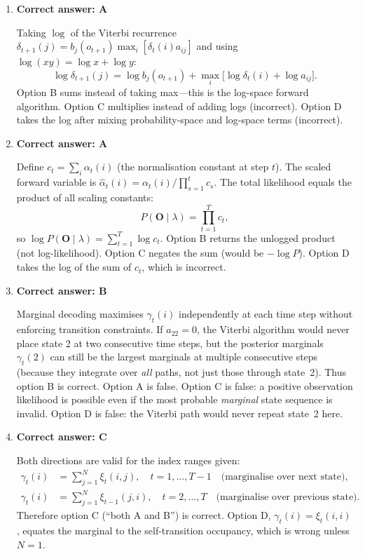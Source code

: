 \documentclass[12pt]{article}
\begin{document}
\begin{enumerate}[label=\textbf{Q\arabic*.}, leftmargin=*, itemsep=1.5em]
\item \textbf{Correct answer: A}

Taking $\log$ of the Viterbi recurrence $\delta_{t+1}(j) = b_j(o_{t+1})\max_i[\delta_t(i)a_{ij}]$ and using $\log(xy) = \log x + \log y$:
\[
    \log\delta_{t+1}(j)
    = \log b_j(o_{t+1}) + \max_{i}\bigl[\log\delta_t(i) + \log a_{ij}\bigr].
\]
Option B sums instead of taking max---this is the log-space forward algorithm.
Option C multiplies instead of adding logs (incorrect).
Option D takes the log after mixing probability-space and log-space terms (incorrect).

\item \textbf{Correct answer: A}

Define $c_t = \sum_i \alpha_t(i)$ (the normalisation constant at step $t$).
The scaled forward variable is $\hat{\alpha}_t(i) = \alpha_t(i)/\prod_{s=1}^t c_s$.
The total likelihood equals the product of all scaling constants:
\[
    P(\mathbf{O}\mid\lambda) = \prod_{t=1}^{T} c_t,
\]
so $\log P(\mathbf{O}\mid\lambda) = \sum_{t=1}^{T}\log c_t$.
Option B returns the unlogged product (not log-likelihood).
Option C negates the sum (would be $-\log P$).
Option D takes the log of the sum of $c_t$, which is incorrect.

\item \textbf{Correct answer: B}

Marginal decoding maximises $\gamma_t(i)$ independently at each time step
without enforcing transition constraints.  If $a_{22}=0$, the Viterbi
algorithm would never place state 2 at two consecutive time steps, but the
posterior marginals $\gamma_t(2)$ can still be the largest marginals at
multiple consecutive steps (because they integrate over \emph{all} paths, not
just those through state~2).  Thus option B is correct.
Option A is false.
Option C is false: a positive observation likelihood is possible even if the
most probable \emph{marginal} state sequence is invalid.
Option D is false: the Viterbi path would never repeat state~2 here.

\item \textbf{Correct answer: C}

Both directions are valid for the index ranges given:
\begin{align*}
    \gamma_t(i) &= \sum_{j=1}^{N} \xi_t(i,j),
    \quad t = 1, \dots, T-1 \quad \text{(marginalise over next state)}, \\
    \gamma_t(i) &= \sum_{j=1}^{N} \xi_{t-1}(j,i),
    \quad t = 2, \dots, T \quad \text{(marginalise over previous state)}.
\end{align*}
Therefore option C (``both A and B'') is correct.
Option D, $\gamma_t(i) = \xi_t(i,i)$, equates the marginal to the
self-transition occupancy, which is wrong unless $N=1$.

\end{enumerate}
\end{document}
